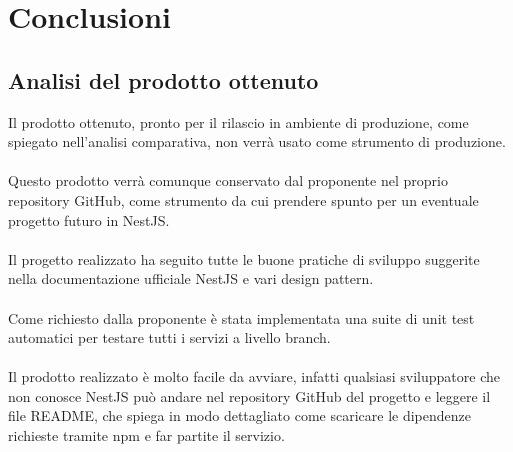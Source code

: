
\chapter{Conclusioni}
\label{cap:conclusioni}


\section{Analisi del prodotto ottenuto}
Il prodotto ottenuto, pronto per il rilascio in ambiente di produzione, come spiegato nell'analisi
comparativa, non verrà usato come strumento di produzione.
\\\\
Questo prodotto verrà comunque conservato dal proponente nel proprio repository GitHub, come strumento
da cui prendere spunto per un eventuale progetto futuro in NestJS.
\\\\
Il progetto realizzato ha seguito tutte le buone pratiche di sviluppo suggerite nella documentazione ufficiale
NestJS e vari design pattern.
\\\\
Come richiesto dalla proponente è stata implementata una suite di unit test automatici per testare tutti i servizi 
a livello branch.
\\\\
Il prodotto realizzato è molto facile da avviare, infatti qualsiasi sviluppatore che non conosce NestJS può andare 
nel repository GitHub del progetto e leggere il file README, che spiega in modo dettagliato come scaricare le 
dipendenze richieste tramite npm e far partite il servizio.

